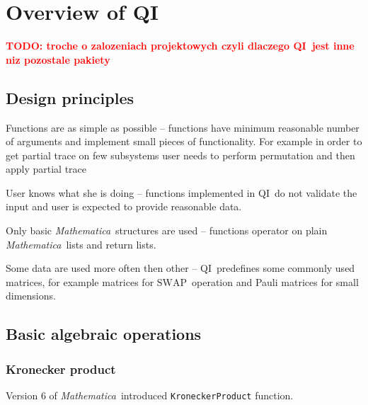 \documentclass[final,5p,times]{elsarticle}
\newcommand{\Mathematica}{\emph{Mathematica}}
\newcommand{\1}{{\rm 1\hspace{-0.9mm}l}}
\newcommand{\SWAP}{\ensuremath{\mathrm{SWAP}}}
\newcommand{\qi}{QI}
\newcommand{\code}[1]{\texttt{\small #1}}
\newcommand{\todo}[1]{\textcolor{red}{\bf TODO: #1}}
\begin{document}
\section{Overview of \qi}\label{sec:over}
\todo{troche o zalozeniach projektowych czyli dlaczego \qi\ jest inne niz
pozostale pakiety}

\subsection{Design principles}

\begin{list}{\textbf{P}}{}
\item Functions are as simple as possible -- functions have minimum reasonable
number of arguments and implement small pieces of functionality. For example in
order to get partial trace on few subsystems user needs to perform permutation
and then apply partial trace 
\item User knows what she is doing -- functions implemented in \qi\ do not
validate the input and user is expected to provide reasonable data.
\item Only basic \Mathematica\ structures are used -- functions operator on
plain \Mathematica\ lists and return lists.
\item Some data are used more often then other -- \qi\ predefines some commonly
used matrices, for example matrices for \SWAP\ operation and Pauli matrices for
small dimensions.
\end{list}

\subsection{Basic algebraic operations}

\subsubsection{Kronecker product}
Version 6 of \Mathematica\ introduced \code{KroneckerProduct} function.
\end{document}

